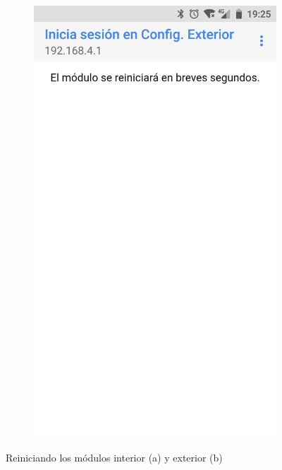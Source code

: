 \begin{figure}[b!]
\begin{subfigure}{0.49\columnwidth}
  \caption{}
  \label{fig:interior-restart}
\end{subfigure}
\hfill
\begin{subfigure}{0.49\columnwidth}
  \centering
  \includegraphics[width=1\columnwidth,frame]{images/exterior-restart}
  \caption{}
  \label{fig:exterior-restart}
\end{subfigure}
\caption{Reiniciando los módulos interior (a) y exterior (b)}
\label{fig:restart}
\end{figure}

